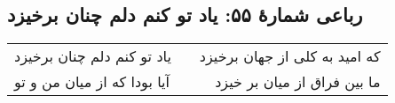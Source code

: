 \begin{center}
\section*{رباعی شمارهٔ ۵۵: یاد تو کنم دلم چنان برخیزد}
\label{sec:055}
\begin{longtable}{l p{0.5cm} r}
یاد تو کنم دلم چنان برخیزد
&&
که امید به کلی از جهان برخیزد
\\
آیا بودا که از میان من و تو
&&
ما بین فراق از میان بر خیزد
\\
\end{longtable}
\end{center}
